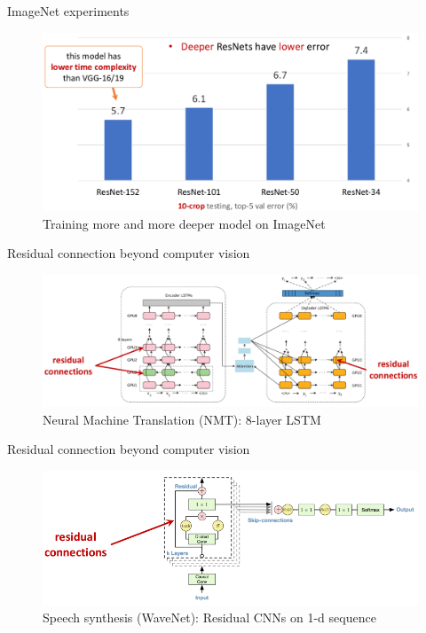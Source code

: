 \documentclass[aspectratio=169]{beamer}
\begin{document}
\begin{frame}{ImageNet experiments}
\begin{figure}
    \centering
    \includegraphics[scale=0.35]{demo/figs/ex2.png}
    \caption{Training more and more deeper model on ImageNet}
    \label{fig:imgnetresnet}
\end{figure}
\end{frame}

\begin{frame}{Residual connection beyond computer vision}
\begin{figure}
    \centering
    \includegraphics[scale=0.3]{demo/figs/nmt.png}
    \caption{Neural Machine Translation (NMT): 8-layer LSTM}
    \label{fig:nmt}
\end{figure}
\end{frame}

\begin{frame}{Residual connection beyond computer vision}
\begin{figure}
    \centering
    \includegraphics[scale=0.4]{demo/figs/wavenet.png}
    \caption{Speech synthesis (WaveNet): Residual CNNs on 1-d sequence}
    \label{fig:wavenet}
\end{figure}
\end{frame}
\end{document}
